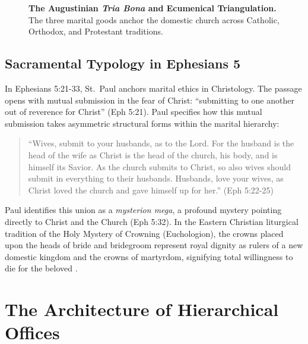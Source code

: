 \documentclass[11pt,twocolumn]{article}
\begin{document}
\begin{figure}[H]
\caption{\textbf{The Augustinian \textit{Tria Bona} and Ecumenical Triangulation.} The three marital goods anchor the domestic church across Catholic, Orthodox, and Protestant traditions.}
\label{fig:tria_bona}
\end{figure}

\subsection{Sacramental Typology in Ephesians 5}
In Ephesians 5:21-33, St.~Paul anchors marital ethics in Christology. The passage opens with mutual submission in the fear of Christ: ``submitting to one another out of reverence for Christ'' (Eph 5:21). Paul specifies how this mutual submission takes asymmetric structural forms within the marital hierarchy:
\begin{quote}
``Wives, submit to your husbands, as to the Lord. For the husband is the head of the wife as Christ is the head of the church, his body, and is himself its Savior. As the church submits to Christ, so also wives should submit in everything to their husbands. Husbands, love your wives, as Christ loved the church and gave himself up for her.'' (Eph 5:22-25)
\end{quote}
Paul identifies this union as a \textit{mysterion mega}, a profound mystery pointing directly to Christ and the Church (Eph 5:32). In the Eastern Christian liturgical tradition of the Holy Mystery of Crowning (Euchologion), the crowns placed upon the heads of bride and bridegroom represent royal dignity as rulers of a new domestic kingdom and the crowns of martyrdom, signifying total willingness to die for the beloved \cite{chrysostom_eph, chrysostom_marriage}.

\section{The Architecture of Hierarchical Offices}
\end{document}
